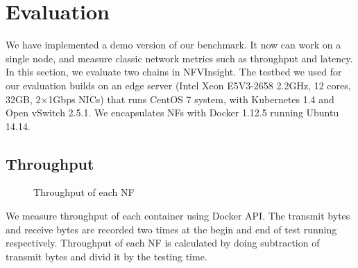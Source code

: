 \documentclass{sig-alternate-10pt}
\begin{document}
\section{Evaluation}
We have implemented a demo version of our benchmark.
It now can work on a single node,
and measure classic network metrics such as throughput and latency.
In this section, we evaluate two chains in NFVInsight.
The testbed we used for our evaluation builds on an edge server (Intel Xeon E5V3-2658 2.2GHz, 12 cores, 32GB, 2$\times$1Gbps NICs) that runs CentOS 7 system, with Kubernetes 1.4 and Open vSwitch 2.5.1. We encapsulates NFs with Docker 1.12.5 running Ubuntu 14.14.

\subsection{Throughput}

%

\begin{figure}[!t]
\centering
{}
\hfil
{}
\hfil
\caption{Throughput of each NF}
\label{throughput}
\end{figure}

We measure throughput of each container using Docker API.
The transmit bytes and receive bytes are recorded two times
at the begin and end of test running respectively.
Throughput of each NF is calculated
by doing subtraction of transmit bytes and divid it by the testing time.
\end{document}
